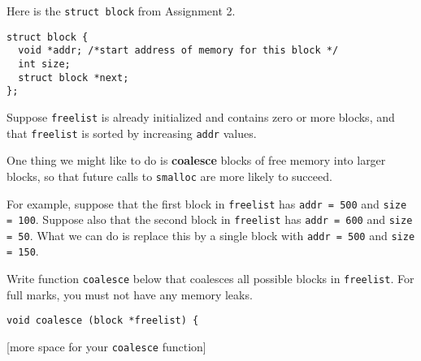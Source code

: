 
Here is the \verb|struct block| from Assignment 2.

\begin{small}
\begin{verbatim}
struct block {
  void *addr; /*start address of memory for this block */
  int size;
  struct block *next;
};
\end{verbatim}
\end{small}

Suppose \verb|freelist| is already initialized and contains zero or more blocks, and that \verb|freelist| is sorted by increasing \verb|addr| values.

One thing we might like to do is {\bf coalesce} blocks of free memory into larger blocks, so that future calls to \verb|smalloc| are more likely to succeed.

For example, suppose that the first block in \verb|freelist| has \verb|addr = 500| and \verb|size = 100|. Suppose also that the second block in \verb|freelist| has \verb|addr = 600| and \verb|size = 50|. What we can do is replace this by a single block with \verb|addr = 500| and \verb|size = 150|.

Write function \verb|coalesce| below that coalesces all possible blocks in \verb|freelist|. For full marks, you must not have any memory leaks.

\begin{small}
\begin{verbatim}
void coalesce (block *freelist) {
\end{verbatim}
\end{small}

\newpage

[more space for your \verb|coalesce| function]

\newpage
